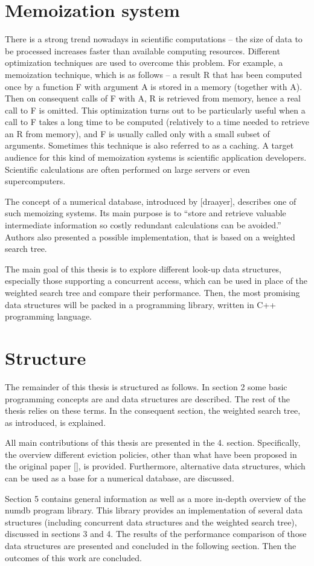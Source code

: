 
\section{Memoization system}
There is a strong trend nowadays in scientific computations – the size of data to be processed increases faster than available computing resources. Different optimization techniques are used to overcome this problem. For example, a memoization technique, which is as follows – a result R that has been computed once by a function F with argument A is stored in a memory (together with A). Then on consequent calls of F with A, R is retrieved from memory, hence a real call to F is omitted. This optimization turns out to be particularly useful when a call to F takes a long time to be computed (relatively to a time needed to retrieve an R from memory), and F is usually called only with a small subset of arguments. Sometimes this technique is also referred to as a caching. A target audience for this kind of memoization systems is scientific application developers. Scientific calculations are often performed on large servers or even supercomputers.


The concept of a numerical database, introduced by [draayer], describes one of such memoizing systems. Its main purpose is to “store and retrieve valuable intermediate information so costly redundant calculations can be avoided.” Authors also presented a possible implementation, that is based on a weighted search tree.

The main goal of this thesis is to explore different look-up data structures, especially those supporting a concurrent access, which can be used in place of the weighted search tree and compare their performance. Then, the most promising data structures will be packed in a programming library, written in C++ programming language.


\section{Structure}
The remainder of this thesis is structured as follows. In section 2 some basic programming concepts are and data structures are described. The rest of the thesis relies on these terms. In the consequent section, the weighted search tree, as introduced, is explained.

All main contributions of this thesis are presented in the 4. section. Specifically, the overview different eviction policies, other than what have been proposed in the original paper [], is provided. Furthermore, alternative data structures, which can be used as a base for a numerical database, are discussed.

Section 5 contains general information as well as a more in-depth overview of the numdb program library. This library provides an implementation of several data structures (including concurrent data structures and the weighted search tree), discussed in sections 3 and 4. The results of the performance comparison of those data structures are presented and concluded in the following section. Then the outcomes of this work are concluded.

